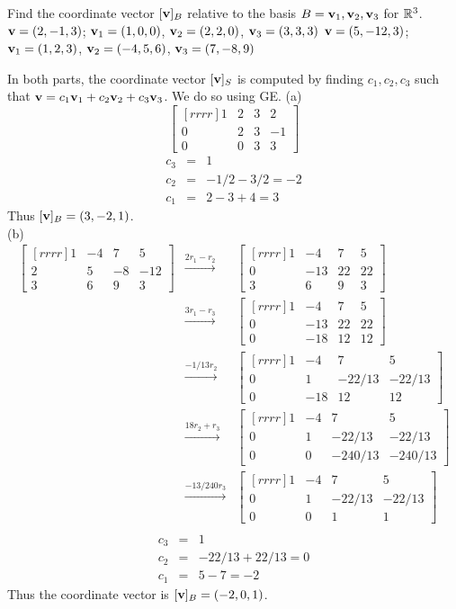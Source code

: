 \bb
\ii Find the coordinate vector $[{\mathbf v}]_B$ relative to the basis $B= {{\mathbf v}_1,{\mathbf v}_2,{\mathbf v}_3}$ for ${\mathbb R}^3$.
\bb
\ii ${\mathbf v} =(2,-1,3)$; ${\mathbf v}_1 = (1,0,0)$, ${\mathbf v}_2=(2,2,0)$, ${\mathbf v}_3 = (3,3,3)$
\ii ${\mathbf v} =(5,-12,3)$; ${\mathbf v}_1 = (1,2,3)$, ${\mathbf v}_2=(-4,5,6)$, ${\mathbf v}_3 = (7,-8,9)$
\ee
\begin{solution}
\noindent In both parts, the coordinate vector $[{\mathbf v}]_S$ is computed by finding $c_1,c_2,c_3$ such that ${\mathbf v}=c_1{\mathbf v}_1+c_2{\mathbf v}_2+c_3{\mathbf v}_3$. We do so using GE. 
\noindent (a) 
$$
\begin{bmatrix}[rrrr]
1&2&3&2\\
0&2&3&-1\\
0&0&3&3
\end{bmatrix}
$$
\begin{eqnarray*}
c_3 &=& 1\\
c_2 &=& -1/2 -3/2 = -2\\
c_1 &=& 2-3+4 = 3
\end{eqnarray*}
Thus $[{\mathbf v}]_B=(3,-2,1)$.
\\
(b) 
\begin{eqnarray*}
\begin{bmatrix}[rrrr]
1&-4&7&5\\
2&5&-8&-12\\
3&6&9&3
\end{bmatrix}
&\xrightarrow[]{2r_1-r_2}&
\begin{bmatrix}[rrrr]
1&-4&7&5\\
0&-13&22&22\\
3&6&9&3
\end{bmatrix}\\
&\xrightarrow[]{3r_1-r_3}&
\begin{bmatrix}[rrrr]
1&-4&7&5\\
0&-13&22&22\\
0&-18&12&12
\end{bmatrix}\\
&\xrightarrow[]{-1/13r_2}&
\begin{bmatrix}[rrrr]
1&-4&7&5\\
0&1&-22/13&-22/13\\
0&-18&12&12
\end{bmatrix}\\
&\xrightarrow[]{18r_2+r_3}&
\begin{bmatrix}[rrrr]
1&-4&7&5\\
0&1&-22/13&-22/13\\
0&0&-240/13&-240/13
\end{bmatrix}\\
&\xrightarrow[]{-13/240r_3}&
\begin{bmatrix}[rrrr]
1&-4&7&5\\
0&1&-22/13&-22/13\\
0&0&1&1
\end{bmatrix}\\
\end{eqnarray*}
\begin{eqnarray*}
c_3 &=& 1\\
c_2 &=& -22/13 + 22/13 = 0\\
c_1 &=& 5 - 7 = -2
\end{eqnarray*}
Thus the coordinate vector is $[{\mathbf v}]_B=(-2,0,1)$.
\end{solution}
